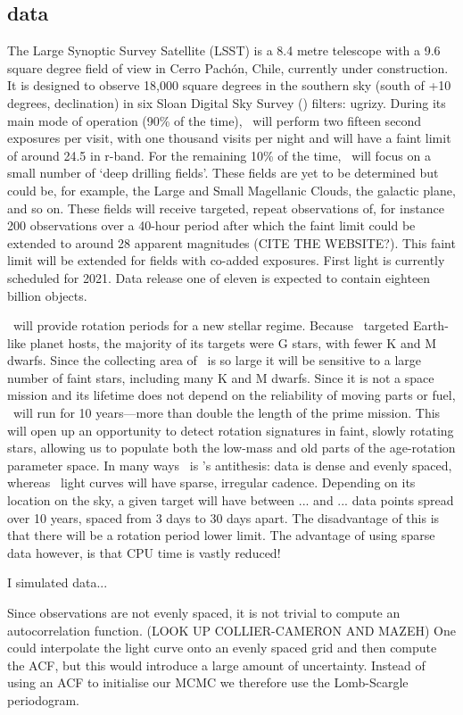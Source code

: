 \subsection{\LSST data}
The Large Synoptic Survey Satellite (LSST) is a 8.4 metre telescope with a 9.6
square degree field of view in Cerro Pach\'{o}n, Chile, currently under
construction.
It is designed to observe 18,000 square degrees in the southern sky (south of
+10 degrees, declination) in six Sloan Digital Sky Survey (\SDSS) filters:
ugrizy.
During its main mode of operation (90\% of the time), \LSST\ will perform two
fifteen second exposures per visit, with one thousand visits per night and
will have a faint limit of around 24.5 in r-band.
For the remaining 10\% of the time, \LSST\ will focus on a small number of
`deep drilling fields'.
These fields are yet to be determined but could be, for example, the Large and
Small Magellanic Clouds, the galactic plane, and so on.
These fields will receive targeted, repeat observations of, for instance 200
observations over a 40-hour period after which the faint limit could be
extended to around 28 apparent magnitudes (CITE THE WEBSITE?).
This faint limit will be extended for fields with co-added exposures.
First light is currently scheduled for 2021.
Data release one of eleven is expected to contain eighteen billion objects.

\LSST\ will provide rotation periods for a new stellar regime.
Because \kepler\ targeted Earth-like planet hosts, the majority of its
targets were G stars, with fewer K and M dwarfs.
Since the collecting area of \LSST\ is so large it will be sensitive to a
large number of faint stars, including many K and M dwarfs.
Since it is not a space mission and its lifetime does not depend on the
reliability of moving parts or fuel, \LSST\ will run for 10 years---more than
double the length of the \kepler prime mission.
This will open up an opportunity to detect rotation signatures in faint,
slowly rotating stars, allowing us to populate both the low-mass and old parts
of the age-rotation parameter space.
In many ways \LSST\ is \kepler's antithesis: \kepler data is dense and evenly
spaced, whereas \LSST\ light curves will have sparse, irregular cadence.
Depending on its location on the sky, a given target will have between ... and
... data points spread over 10 years, spaced from 3 days to 30 days apart.
The disadvantage of this is that there will be a rotation period lower limit.
The advantage of using sparse data however, is that CPU time is vastly
reduced!

I simulated \LSST data...

Since \LSST observations are not evenly spaced, it is not trivial to compute
an autocorrelation function.
(LOOK UP COLLIER-CAMERON AND MAZEH)
One could interpolate the light curve onto an evenly spaced grid and then
compute the ACF, but this would introduce a large amount of uncertainty.
Instead of using an ACF to initialise our MCMC we therefore use the
Lomb-Scargle periodogram.
